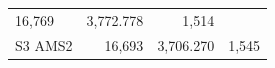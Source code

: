 \documentclass[]{article}
\begin{document}
\begin{longtable}[]{@{}lrrr@{}}
\begin{minipage}[t]{0.21\columnwidth}
16,769\strut
\end{minipage} & \begin{minipage}[t]{0.20\columnwidth}\raggedleft\strut
3,772.778\strut
\end{minipage} & \begin{minipage}[t]{0.09\columnwidth}\raggedleft\strut
1,514\strut
\end{minipage}\tabularnewline
\begin{minipage}[t]{0.16\columnwidth}\raggedright\strut
S3 AMS2\strut
\end{minipage} & \begin{minipage}[t]{0.21\columnwidth}\raggedleft\strut
16,693\strut
\end{minipage} & \begin{minipage}[t]{0.20\columnwidth}\raggedleft\strut
3,706.270\strut
\end{minipage} & \begin{minipage}[t]{0.09\columnwidth}\raggedleft\strut
1,545\strut
\end{minipage}\tabularnewline
\bottomrule
\end{longtable}
\end{document}
